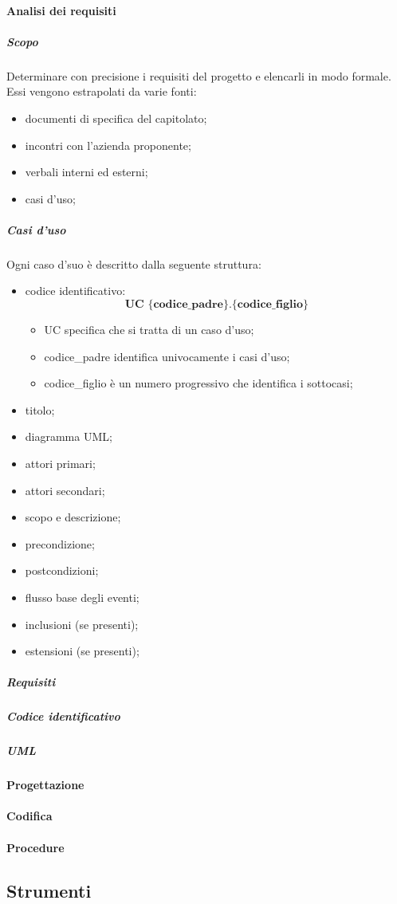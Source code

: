\paragraph{Analisi dei requisiti}
\subparagraph{Scopo}\Spazio
Determinare con precisione i requisiti del progetto e elencarli in modo formale. Essi vengono estrapolati da varie fonti:
\begin{itemize}
	\item documenti di specifica del capitolato; 	
	\item incontri con l'azienda proponente; 	
	\item verbali interni ed esterni; 	
	\item casi d'uso; 	
\end{itemize}
\subparagraph{Casi d'uso}\Spazio
Ogni caso d'suo è descritto dalla seguente struttura:
\begin{itemize}
	\item codice identificativo: $$ \textbf{UC \{codice\_padre\}.\{codice\_figlio\}  } $$ 
		\begin{itemize}
				\item UC specifica che si tratta di un caso d'uso; 	
				\item codice\_padre identifica univocamente i casi d'uso; 	
				\item codice\_figlio è un numero progressivo che identifica i sottocasi; 	
		\end{itemize}		
	\item titolo; 	
	\item diagramma UML; 	
	\item attori primari; 	
	\item attori secondari; 	
	\item scopo e descrizione; 	
	\item precondizione; 	
	\item postcondizioni; 	
	\item flusso base degli eventi; 	
	\item inclusioni (se presenti); 	
	\item estensioni (se presenti); 	
\end{itemize}
\subparagraph{Requisiti}\Spazio
\subparagraph{Codice identificativo}\Spazio
\subparagraph{UML}\Spazio
\paragraph{Progettazione}
\paragraph{Codifica}
\paragraph{Procedure}
\subsection{Strumenti}
\pagebreak